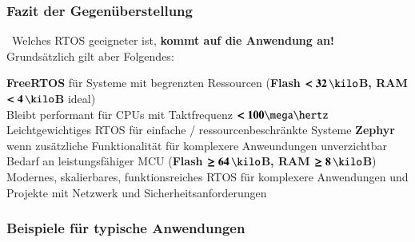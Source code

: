\subsubsection{Fazit der Gegenüberstellung}

\textrightarrow\ Welches RTOS geeigneter ist, \textbf{kommt auf die Anwendung an!} \\
Grundsätzlich gilt aber Folgendes:

\vspace{0.1cm}

\begin{outline}
    \1 \textbf{FreeRTOS} für Systeme mit begrenzten Ressourcen (\textbf{Flash $\bm{< 32 \, \kilo}$B, RAM $\bm{< 4 \, \kilo}$B} ideal) \\
        Bleibt performant für CPUs mit Taktfrequenz $\bm{< 100 \mega \hertz}$
        \2 Leichtgewichtiges RTOS für einfache / ressourcenbeschränkte Systeme
    \1  \textbf{Zephyr} wenn zusätzliche Funktionalität für komplexere Anweundungen unverzichtbar \\
        Bedarf an leistungsfähiger MCU (\textbf{Flash $\bm{\geq 64 \, \kilo}$B, RAM $\bm{\geq 8 \, \kilo}$B})
        \2 Modernes, skalierbares, funktionsreiches RTOS für komplexere Anwendungen und Projekte mit Netzwerk und Sicherheitsanforderungen
\end{outline}


\subsubsection{Beispiele für typische Anwendungen}



